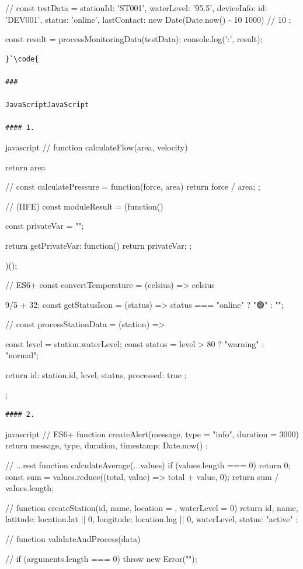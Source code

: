 {// 
const testData = {
    stationId: 'ST001',
    waterLevel: '95.5',
    deviceInfo: {
        id: 'DEV001',
        status: 'online',
        lastContact: new Date(Date.now() - 10  1000) // 10
    }
};

const result = processMonitoringData(testData);
console.log(':', result);
\begin{lstlisting}
}`\code{

### 

JavaScriptJavaScript

#### 1. 

\end{lstlisting}javascript
// 
function calculateFlow(area, velocity) {
    return area 

// 
const calculatePressure = function(force, area) {
    return force / area;
};

//  (IIFE)
const moduleResult = (function() {
    const privateVar = "";
    
    return {
        getPrivateVar: function() {
            return privateVar;
        }
    };
})();

// ES6+
const convertTemperature = (celsius) => celsius } 9/5 + 32;
const getStatusIcon = (status) => status === "online" ? "🟢" : "";

// 
const processStationData = (station) => {
    const level = station.waterLevel;
    const status = level > 80 ? "warning" : "normal";
    
    return {
        id: station.id,
        level,
        status,
        processed: true
    };
};
\begin{lstlisting}
#### 2. 

\end{lstlisting}javascript
// ES6+
function createAlert(message, type = "info", duration = 3000) {
    return {
        message,
        type,
        duration,
        timestamp: Date.now()
    };
}

// ...rest
function calculateAverage(...values) {
    if (values.length === 0) return 0;
    const sum = values.reduce((total, value) => total + value, 0);
    return sum / values.length;
}

// 
function createStation({id, name, location = {}, waterLevel = 0}) {
    return {
        id,
        name,
        latitude: location.lat || 0,
        longitude: location.lng || 0,
        waterLevel,
        status: "active"
    };
}

// 
function validateAndProcess(data) {
    // 
    if (arguments.length === 0) {
        throw new Error("");
    }
    
}}
